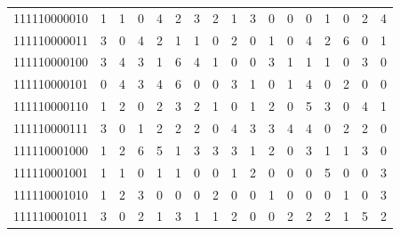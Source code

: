 \documentclass[10pt,a4paper]{article}
\begin{document}
\begin{longtable}{ |c|c|c|c|c|c|c|c|c|c|c|c|c|c|c|c|c| }
    111110000010              & 1                            & 1                                & 0                            & 4                              & 2   & 3   & 2   & 1   & 3   & 0   & 0   & 0   & 1   & 0   & 2   & 4   \\
    111110000011              & 3                            & 0                                & 4                            & 2                              & 1   & 1   & 0   & 2   & 0   & 1   & 0   & 4   & 2   & 6   & 0   & 1   \\
    111110000100              & 3                            & 4                                & 3                            & 1                              & 6   & 4   & 1   & 0   & 0   & 3   & 1   & 1   & 1   & 0   & 3   & 0   \\
    111110000101              & 0                            & 4                                & 3                            & 4                              & 6   & 0   & 0   & 3   & 1   & 0   & 1   & 4   & 0   & 2   & 0   & 0   \\
    111110000110              & 1                            & 2                                & 0                            & 2                              & 3   & 2   & 1   & 0   & 1   & 2   & 0   & 5   & 3   & 0   & 4   & 1   \\
    111110000111              & 3                            & 0                                & 1                            & 2                              & 2   & 2   & 0   & 4   & 3   & 3   & 4   & 4   & 0   & 2   & 2   & 0   \\
    111110001000              & 1                            & 2                                & 6                            & 5                              & 1   & 3   & 3   & 3   & 1   & 2   & 0   & 3   & 1   & 1   & 3   & 0   \\
    111110001001              & 1                            & 1                                & 0                            & 1                              & 1   & 0   & 0   & 1   & 2   & 0   & 0   & 0   & 5   & 0   & 0   & 3   \\
    111110001010              & 1                            & 2                                & 3                            & 0                              & 0   & 0   & 2   & 0   & 0   & 1   & 0   & 0   & 0   & 1   & 0   & 3   \\
    111110001011              & 3                            & 0                                & 2                            & 1                              & 3   & 1   & 1   & 2   & 0   & 0   & 2   & 2   & 2   & 1   & 5   & 2   \\

\end{longtable}
\end{document}
